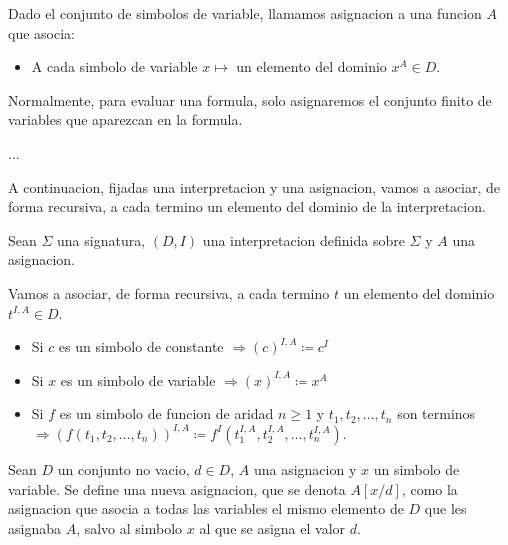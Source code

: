 \begin{definition}
	Dado el conjunto de simbolos de variable, llamamos asignacion a una funcion \(A \) que asocia:
	\begin{itemize}
		\item A cada simbolo de variable \(x \mapsto\) un elemento del dominio \(x^{A } \in D \).
	\end{itemize}
\end{definition}

\begin{remark}
	Normalmente, para evaluar una formula, solo asignaremos el conjunto finito de variables que aparezcan en la formula.

	...
\end{remark}

A continuacion, fijadas una interpretacion y una asignacion, vamos a asociar, de forma recursiva, a cada termino un elemento del dominio de la interpretacion.
\begin{definition}
	Sean \(\Sigma \) una signatura, \((D,I )\) una interpretacion definida sobre \(\Sigma \) y \(A \) una asignacion.

	Vamos a asociar, de forma recursiva, a cada termino \(t \) un elemento del dominio \(t^{I,A } \in D \).
	\begin{itemize}
		\item Si \(c \) es un simbolo de constante \(\Rightarrow (c)^{I,A } \coloneqq c^{I}  \)
		\item Si \(x \) es un simbolo de variable \(\Rightarrow (x)^{I,A} \coloneqq x^{A } \)
		\item Si \(f \) es un simbolo de funcion de aridad \(n \geq  1 \) y \(t_1,t_2,\ldots,t_n \) son terminos \(\Rightarrow (f(t_1,t_2,\ldots,t_n))^{I,A} \coloneqq f^{I}(t^{I,A}_1,t^{I,A}_2,\ldots,t^{I,A}_n  )  \).
	\end{itemize}
\end{definition}

Sean \(D \) un conjunto no vacio, \(d \in D \), \(A \) una asignacion y \(x \) un simbolo de variable. Se define una nueva asignacion, que se denota \(A[x / d ]\), como la asignacion que asocia a todas las variables el mismo elemento de \(D \) que les asignaba \(A\), salvo al simbolo \(x \) al que se asigna el valor \(d \).

